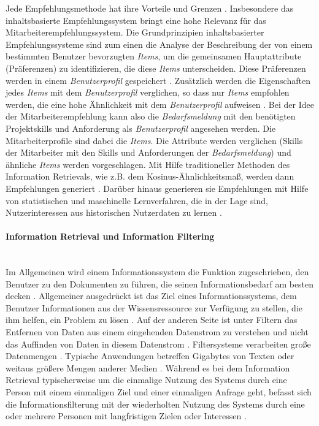 Jede Empfehlungsmethode hat ihre Vorteile und Grenzen \cite{lu2020recommender}. Insbesondere das inhaltsbasierte Empfehlungssystem bringt eine hohe Relevanz für das Mitarbeiterempfehlungssystem. Die Grundprinzipien inhaltsbasierter Empfehlungssysteme sind zum einen die Analyse der Beschreibung der von einem bestimmten Benutzer bevorzugten \emph{Items}, um die gemeinsamen Hauptattribute (Präferenzen) zu identifizieren, die diese \emph{Items} unterscheiden. Diese Präferenzen werden in einem \emph{Benutzerprofil} gespeichert \cite{lu2020recommender}. Zusätzlich werden die Eigenschaften jedes \emph{Items} mit dem \emph{Benutzerprofil} verglichen, so dass nur \emph{Items} empfohlen werden, die eine hohe Ähnlichkeit mit dem \emph{Benutzerprofil} aufweisen \cite{lu2020recommender}. Bei der Idee der Mitarbeiterempfehlung kann also die \emph{Bedarfsmeldung} mit den benötigten Projektskills und Anforderung als \emph{Benutzerprofil} angesehen werden. Die Mitarbeiterprofile sind dabei die \emph{Items}. Die Attribute werden verglichen (Skills der Mitarbeiter mit den Skills und Anforderungen der \emph{Bedarfsmeldung}) und ähnliche \emph{Items} werden vorgeschlagen. Mit Hilfe traditioneller Methoden des Information Retrievals, wie z.B. dem Kosinus-Ähnlichkeitsmaß, werden dann Empfehlungen generiert \cite{lu2020recommender}. Darüber hinaus generieren sie Empfehlungen mit Hilfe von statistischen und maschinelle Lernverfahren, die in der Lage sind, Nutzerinteressen aus historischen Nutzerdaten zu lernen \cite{lu2020recommender}.
\paragraph{Information Retrieval und Information Filtering}\mbox{} \\
Im Allgemeinen wird einem Informationssystem die Funktion zugeschrieben, den Benutzer zu den Dokumenten zu führen, die seinen Informationsbedarf am besten decken \cite{belkin1992information}. Allgemeiner ausgedrückt ist das Ziel eines Informationssystems, dem Benutzer Informationen aus der Wissensressource zur Verfügung zu stellen, die ihm helfen, ein Problem zu lösen \cite{belkin1992information}. Auf der anderen Seite ist unter Filtern das Entfernen von Daten aus einem eingehenden Datenstrom zu verstehen und nicht das Auffinden von Daten in diesem Datenstrom \cite{belkin1992information}. Filtersysteme verarbeiten große Datenmengen \cite{belkin1992information}. Typische Anwendungen betreffen Gigabytes von Texten oder weitaus größere Mengen anderer Medien \cite{belkin1992information}. Während es bei dem Information Retrieval typischerweise um die einmalige Nutzung des Systems durch eine Person mit einem einmaligen Ziel und einer einmaligen Anfrage geht, befasst sich die Informationsfilterung mit der wiederholten Nutzung des Systems durch eine oder mehrere Personen mit langfristigen Zielen oder Interessen \cite{belkin1992information}.
